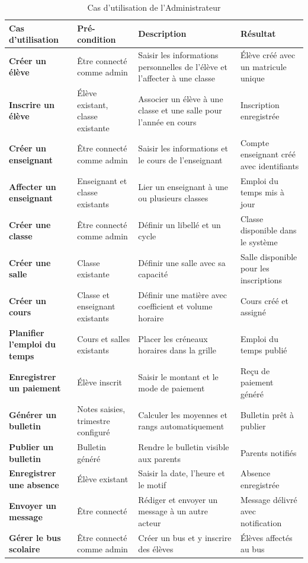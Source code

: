 \documentclass[12pt, a4paper, twoside, openright]{report}
\begin{document}
\begin{table}[htbp]
  \centering
  \caption{Cas d'utilisation de l'Administrateur}
  \small
  \begin{tabularx}{\textwidth}{>{\bfseries}p{3.5cm} p{3cm} X p{2.5cm}}
    \toprule
    \textbf{Cas d'utilisation} & \textbf{Pré-condition} & \textbf{Description} & \textbf{Résultat} \\
    \midrule
    Créer un élève & Être connecté comme admin & Saisir les informations personnelles de l'élève et l'affecter à une classe & Élève créé avec un matricule unique \\
    Inscrire un élève & Élève existant, classe existante & Associer un élève à une classe et une salle pour l'année en cours & Inscription enregistrée \\
    Créer un enseignant & Être connecté comme admin & Saisir les informations et le cours de l'enseignant & Compte enseignant créé avec identifiants \\
    Affecter un enseignant & Enseignant et classe existants & Lier un enseignant à une ou plusieurs classes & Emploi du temps mis à jour \\
    Créer une classe & Être connecté comme admin & Définir un libellé et un cycle & Classe disponible dans le système \\
    Créer une salle & Classe existante & Définir une salle avec sa capacité & Salle disponible pour les inscriptions \\
    Créer un cours & Classe et enseignant existants & Définir une matière avec coefficient et volume horaire & Cours créé et assigné \\
    Planifier l'emploi du temps & Cours et salles existants & Placer les créneaux horaires dans la grille & Emploi du temps publié \\
    Enregistrer un paiement & Élève inscrit & Saisir le montant et le mode de paiement & Reçu de paiement généré \\
    Générer un bulletin & Notes saisies, trimestre configuré & Calculer les moyennes et rangs automatiquement & Bulletin prêt à publier \\
    Publier un bulletin & Bulletin généré & Rendre le bulletin visible aux parents & Parents notifiés \\
    Enregistrer une absence & Élève existant & Saisir la date, l'heure et le motif & Absence enregistrée \\
    Envoyer un message & Être connecté & Rédiger et envoyer un message à un autre acteur & Message délivré avec notification \\
    Gérer le bus scolaire & Être connecté comme admin & Créer un bus et y inscrire des élèves & Élèves affectés au bus \\
    \bottomrule
  \end{tabularx}
\end{table}
\end{document}
